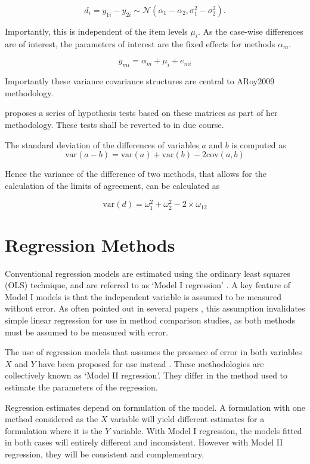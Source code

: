 \documentclass[12pt, a4paper]{report}
\theoremstyle{plain}
\theoremstyle{definition}
\theoremstyle{remark}
\begin{document}
	\[ d_{i} = y_{1i} - y_{2i} \sim \mathcal{N} (\alpha_{1} - \alpha_{2}, \sigma^2_{1} - \sigma^2_{2}). \]
	
	Importantly, this is independent of the item levels $\mu_i$. As the case-wise differences are of interest, the parameters of interest are the fixed effects for methods $\alpha_{m}$.
	
	\[ y_{mi} =  \alpha_{m}  + \mu_{i} + e_{mi}  \]
	
	
	
	
	
	Importantly these variance covariance structures are central to ARoy2009 methodology.
	
	
	\citet{ARoy2009} proposes a series of hypothesis tests based on these matrices as part of her methodology. These tests shall be reverted to in due course.
	
	The standard deviation of the differences of variables $a$ and $b$ is computed as
	\[
	\mbox{var}(a - b) = \mbox{var} ( a )  + \mbox{var} ( b ) - 2\mbox{cov} ( a ,b )
	\]
	
	Hence the variance of the difference of two methods, that allows for the calculation of the limits of agreement, can be calculated as
	
	\[
	\mbox{var}(d) = \omega^2_1  + \omega^2_2 - 2 \times \omega_12
	\]
	
	
	
	


	\section{Regression Methods}
	Conventional regression models are estimated using the ordinary
	least squares (OLS) technique, and are referred to as `Model I
	regression' \citep{CornCoch,ludbrook97}. A key feature of Model I
	models is that the independent variable is assumed to be measured
	without error. As often pointed out in several papers
	\citep{BA83,ludbrook97}, this assumption invalidates simple linear
	regression for use in method comparison studies, as both methods
	must be assumed to be measured with error.
	
	The use of regression models that assumes the presence of error in
	both variables $X$ and $Y$ have been proposed for use instead
	\citep{CornCoch,ludbrook97}. These methodologies are collectively
	known as `Model II regression'. They differ in the method used to
	estimate the parameters of the regression.
	
	Regression estimates depend on formulation of the model. A
	formulation with one method considered as the $X$ variable will
	yield different estimates for a formulation where it is the $Y$
	variable. With Model I regression, the models fitted in both cases
	will entirely different and inconsistent. However with Model II
	regression, they will be consistent and complementary.
	
\end{document}
